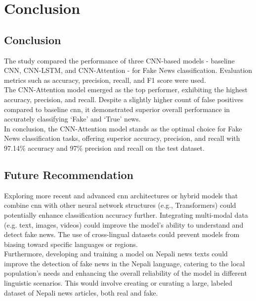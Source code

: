 \chapter{Conclusion}

\section{Conclusion}

The study compared the performance of three CNN-based models - baseline CNN, CNN-LSTM, and CNN-Attention - for Fake News classification. Evaluation metrics such as accuracy, precision, recall, and F1 score were used. \\

The CNN-Attention model emerged as the top performer, exhibiting the highest accuracy, precision, and recall. Despite a slightly higher count of false positives compared to baseline \ac{cnn}, it demonstrated superior overall performance in accurately classifying `Fake' and `True' news.\\

In conclusion, the CNN-Attention model stands as the optimal choice for Fake News classification tasks, offering superior accuracy, precision, and recall with 97.14\% accuracy and 97\% precision and recall on the test dataset.

\section{Future Recommendation}

Exploring more recent and advanced \ac{cnn} architectures or hybrid models that combine \ac{cnn} with other neural network structures (e.g., Transformers) could potentially enhance classification accuracy further. Integrating multi-modal data (e.g. text, images, videos) could improve the model's ability to understand and detect fake news. The use of cross-lingual datasets could prevent models from biasing toward specific languages or regions. \\

Furthermore, developing and training a model on Nepali news texts could improve the detection of fake news in the Nepali language, catering to the local population's needs and enhancing the overall reliability of the model in different linguistic scenarios. This would involve creating or curating a large,  labeled dataset of Nepali news articles, both real and fake.